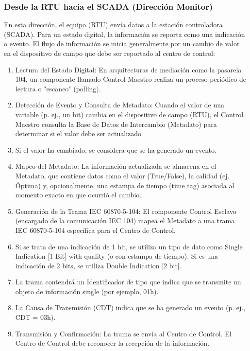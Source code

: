\documentclass[a5paper]{book}%
\begin{document}
\subsubsection{Desde la RTU hacia el \textbf{SCADA} (Dirección Monitor)}
En esta dirección, el equipo (RTU) envía datos a la estación controladora (SCADA). Para un estado digital, la información se reporta como una indicación o evento. El flujo de información se inicia generalmente por un cambio de valor en el dispositivo de campo que debe ser reportado al centro de control:

\begin{enumerate}
\item Lectura del Estado Digital: En arquitecturas de mediación como la pasarela 104, un componente llamado Control Maestro realiza un proceso periódico de lectura o "escaneo" (polling).
\item Detección de Evento y Consulta de Metadato: Cuando el valor de una variable (p. ej., un bit) cambia en el dispositivo de campo (RTU), el Control Maestro consulta la Base de Datos de Intercambio (Metadato) para determinar si el valor debe ser actualizado
\item Si el valor ha cambiado, se considera que se ha generado un evento.
\item Mapeo del Metadato: La información actualizada se almacena en el Metadato, que contiene datos como el valor (True/False), la calidad (ej. Óptima) y, opcionalmente, una estampa de tiempo (time tag) asociada al momento exacto en que ocurrió el cambio.
\item Generación de la Trama IEC 60870-5-104: El componente Control Esclavo (encargado de la comunicación IEC 104) mapea el Metadato a una trama IEC 60870-5-104 específica para el Centro de Control.
\item Si se trata de una indicación de 1 bit, se utiliza un tipo de dato como Single Indication [1 Bit] with quality (o con estampa de tiempo). Si es una indicación de 2 bits, se utiliza Double Indication [2 bit].
\item La trama contendrá un Identificador de tipo que indica que se transmite un objeto de información single (por ejemplo, 01h).
\item La Causa de Transmisión (CDT) indica que se ha generado un evento (p. ej., CDT = 03h).
\item Transmisión y Confirmación: La trama se envía al Centro de Control. El Centro de Control debe reconocer la recepción de la información.
\end{enumerate}
\end{document}
